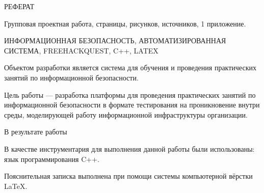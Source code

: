 \begin{center}
РЕФЕРАТ
\end{center}

Групповая проектная работа,  страницы,  рисунков,  источников, 1 приложение.\par 

ИНФОРМАЦИОННАЯ БЕЗОПАСНОСТЬ, АВТОМАТИЗИРОВАННАЯ СИСТЕМА, FREEHACKQUEST, C++, LATEX\par 

Объектом разработки является система для обучения и проведения практических занятий по информационной безопасности.\par 

Цель работы — разработка платформы для проведения практических занятий по информационной безопасности в формате тестирования на проникновение внутри среды, моделирующей работу информационной инфраструктуры организации.\par

В результате работы \par

В качестве инструментария для выполнения данной работы были использованы: язык программирования C++.\par

Пояснительная записка выполнена при помощи системы компьютерной вёрстки \LaTeX.

\clearpage
